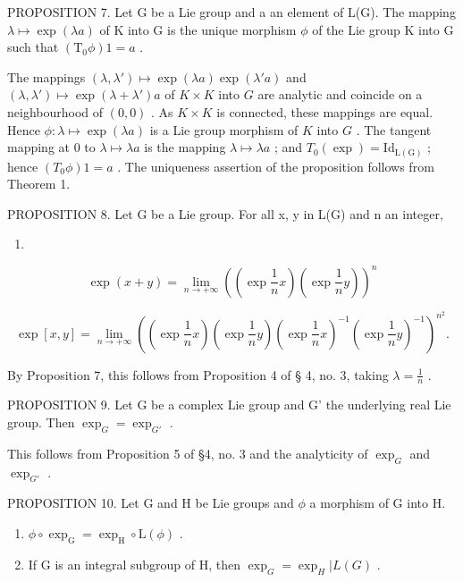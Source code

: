 PROPOSITION 7. Let G be a Lie group and a an element of L(G). The mapping \(\lambda \mapsto \exp(\lambda a)\) of K into G is the unique morphism \(\phi\) of the Lie group K into G such that \((\mathrm{T}_0\phi)1 = a\) .

The mappings \((\lambda, \lambda') \mapsto \exp(\lambda a) \exp(\lambda' a)\) and \((\lambda, \lambda') \mapsto \exp(\lambda + \lambda') a\) of \(K \times K\) into \(G\) are analytic and coincide on a neighbourhood of \((0, 0)\) . As \(K \times K\) is connected, these mappings are equal. Hence \(\phi: \lambda \mapsto \exp(\lambda a)\) is a Lie group morphism of \(K\) into \(G\) . The tangent mapping at \(0\) to \(\lambda \mapsto \lambda a\) is the mapping \(\lambda \mapsto \lambda a\) ; and \(T_0(\exp) = \mathrm{Id}_{\mathrm{L}(\mathrm{G})}\) ; hence \((T_0\phi)1 = a\) . The uniqueness assertion of the proposition follows from Theorem 1.

PROPOSITION 8. Let G be a Lie group. For all x, y in L(G) and n an integer,

\begin{enumerate}
\def\labelenumi{(\arabic{enumi})}
\setcounter{enumi}{1}
\tightlist
\item
\end{enumerate}

\[
\exp (x + y) = \lim _ {n \rightarrow + \infty} \left(\left(\exp \frac {1}{n} x\right)\left(\exp \frac {1}{n} y\right)\right) ^ {n}\tag{2}
\]

\[
\exp [ x, y ] = \lim _ {n \rightarrow + \infty} \left(\left(\exp \frac {1}{n} x\right)\left(\exp \frac {1}{n} y\right)\left(\exp \frac {1}{n} x\right) ^ {- 1} \left(\exp \frac {1}{n} y\right) ^ {- 1}\right) ^ {n ^ {2}}\tag{3}.
\]

By Proposition 7, this follows from Proposition 4 of § 4, no. 3, taking \(\lambda = \frac{1}{n}\) .

PROPOSITION 9. Let G be a complex Lie group and G' the underlying real Lie group. Then \(\exp_{G} = \exp_{G'}\) .

This follows from Proposition 5 of §4, no. 3 and the analyticity of \(\exp_{G}\) and \(\exp_{G'}\) .

PROPOSITION 10. Let G and H be Lie groups and \(\phi\) a morphism of G into H.

\begin{enumerate}
\def\labelenumi{(\roman{enumi})}
\item
  \(\phi \circ \exp_{\mathrm{G}} = \exp_{\mathrm{H}} \circ \mathrm{L}(\phi)\) .
\item
  If G is an integral subgroup of H, then \(\exp_{G} = \exp_{H} | L(G)\) .
\end{enumerate}

